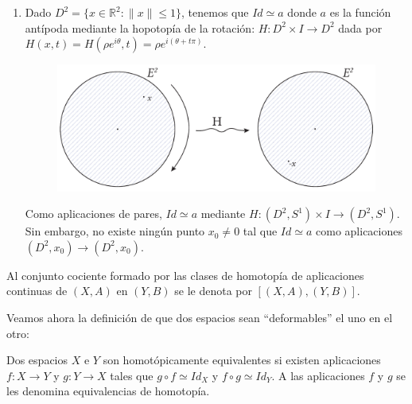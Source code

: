 \begin{ejems}
\begin{enumerate}
\item \label{ej2:3} Dado $D^2 = \{ x \in \mathbb{R}^2 : \| x \| \leq 1 \}$, tenemos que $Id \simeq a$ donde $a$ es la función antípoda mediante la hopotopía de la rotación: $H : D^2 \times I \longrightarrow D^2$ dada por $H(x, t) = H(\rho e^{i\theta}, t) = \rho e^{i(\theta + t\pi)}$. \par
\begin{figure}[h]
\centering
\includegraphics[width=0.65\linewidth]{images/homotrotacalt.pdf}
\end{figure}
Como aplicaciones de pares, $Id \simeq a$ mediante $H : (D^2, S^1) \times I \longrightarrow (D^2, S^1)$. Sin embargo, no existe ningún punto $x_0 \neq 0$ tal que $Id \simeq a$ como aplicaciones $(D^2, x_0) \longrightarrow (D^2, x_0)$.
\end{enumerate}
\end{ejems}
Al conjunto cociente formado por las clases de homotopía de aplicaciones continuas de $(X, A)$ en $(Y, B)$ se le denota por $[(X, A), (Y, B)]$. \par

Veamos ahora la definición de que dos espacios sean ``deformables'' el uno en el otro:

\begin{defin}
Dos espacios $X$ e $Y$ son homotópicamente equivalentes si existen aplicaciones $f: X \longrightarrow Y$ y $g: Y \longrightarrow X$ tales que $g \circ f \simeq Id_X$ y $f \circ g \simeq Id_Y$. A las aplicaciones $f$ y $g$ se les denomina equivalencias de homotopía.
\end{defin}


